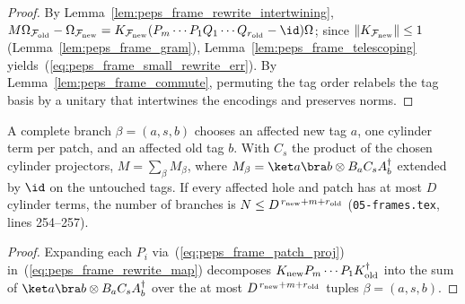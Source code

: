 \begin{proof}\leanok
    By Lemma~\ref{lem:peps_frame_rewrite_intertwining},
    $M\Omega_{\mathcal F_{\rm old}}-\Omega_{\mathcal F_{\rm new}}
        =K_{\mathcal F_{\rm new}}(P_m\cdots P_1Q_1\cdots Q_{r_{\rm old}}-\id)\Omega$;
    since $\lVert K_{\mathcal F_{\rm new}}\rVert\le1$ (Lemma~\ref{lem:peps_frame_gram}), Lemma~\ref{lem:peps_frame_telescoping} yields~(\ref{eq:peps_frame_small_rewrite_err}). By Lemma~\ref{lem:peps_frame_commute}, permuting the tag order relabels the tag basis by a unitary that intertwines the encodings and preserves norms.
\end{proof}

\begin{lemma}
    \label{lem:peps_frame_branches}
    \leanok
    A complete branch $\beta=(a,s,b)$ chooses an affected new tag $a$, one cylinder term per patch, and an affected old tag $b$. With $C_s$ the product of the chosen cylinder projectors,
    $M=\sum_\beta M_\beta$, where $M_\beta=\ket a\bra b\otimes B_aC_sA_b^\dagger$ extended by $\id$ on the
    untouched tags. If every affected hole and patch has at most $D$
    cylinder terms, the number of branches is $N\le D^{\,r_{\rm new}+m+r_{\rm old}}$
    (\texttt{05-frames.tex}, lines 254--257).
\end{lemma}

\begin{proof}\leanok
    Expanding each $P_i$ via~(\ref{eq:peps_frame_patch_proj}) in~(\ref{eq:peps_frame_rewrite_map}) decomposes $K_{\rm new}P_m\cdots P_1K_{\rm old}^\dagger$ into the sum of $\ket a\bra b\otimes B_aC_sA_b^\dagger$ over the at most $D^{\,r_{\rm new}+m+r_{\rm old}}$ tuples $\beta=(a,s,b)$.
\end{proof}

